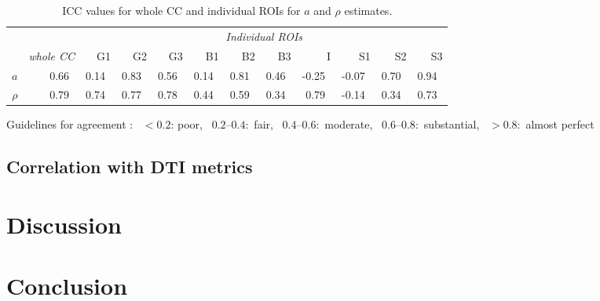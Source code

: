 \label{chapter 9}
\begin{table}[ht]
\caption{ICC values for whole CC and individual ROIs for $a$ and $\rho$ estimates.}
\begin{adjustbox}{width={\textwidth},totalheight=\textheight,keepaspectratio}
\begin{tabular}{rrrrrrrrrrrr}
      \toprule
       & & \multicolumn{10}{c}{\textit{Individual ROIs}}                                             \\
       & \textit{whole CC} & G1    & G2    & G3    & B1    & B2    & B3    & I     & S1    & S2    & S3\\
       \cmidrule(rl){2-2} \cmidrule(l){3-12}
       \addlinespace
$a$    & 0.66~\usebox{\substantialBox} & 0.14~\usebox{\poorBox}  & 0.83~\usebox{\perfectBox} & 0.56~\usebox{\moderateBox}  & 0.14~\usebox{\poorBox}  & 0.81~\usebox{\perfectBox}  & 0.46~\usebox{\moderateBox}  & -0.25~\usebox{\poorBox} & -0.07~\usebox{\poorBox} & 0.70~\usebox{\substantialBox}  & 0.94~\usebox{\perfectBox}  \\
$\rho$ & 0.79~\usebox{\substantialBox} & 0.74~\usebox{\substantialBox}  & 0.77~\usebox{\substantialBox}  & 0.78~\usebox{\substantialBox}  & 0.44~\usebox{\moderateBox}  & 0.59~\usebox{\moderateBox}  & 0.34~\usebox{\fairBox}  & 0.79~\usebox{\substantialBox}  & -0.14~\usebox{\poorBox} & 0.34~\usebox{\fairBox}  & 0.73~\usebox{\substantialBox}  \\
\bottomrule
\end{tabular}
\end{adjustbox}
{\footnotesize Guidelines for agreement  \citep{Landis:1977}: \usebox{\poorBox}~$<0.2$: poor,  \usebox{\fairBox}~$0.2–0.4$:~fair,  \usebox{\moderateBox}~$0.4–0.6$:~moderate, \usebox{\substantialBox}~$0.6–0.8$:~substantial,  \usebox{\perfectBox}~$>0.8$:~almost perfect}
\end{table}

\subsection*{Correlation with DTI metrics}
\section{Discussion}
\section{Conclusion}




